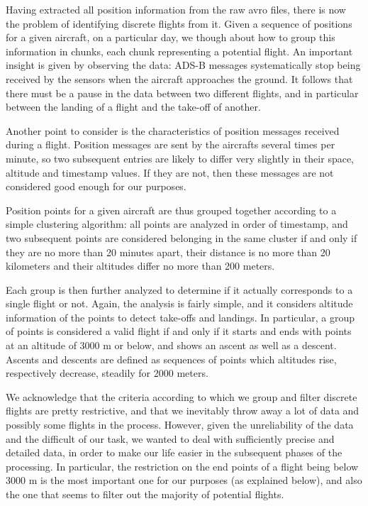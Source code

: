 \documentclass{vldb}
\begin{document}
Having extracted all position information from the raw avro files, there is now
the problem of identifying discrete flights from it.
Given a sequence of positions for a given aircraft, on a particular day, we
though about how to group this information in chunks, each chunk representing a
potential flight. An important insight is given by observing the data: ADS-B
messages systematically stop being received by the sensors when the aircraft
approaches the ground. It follows that there must be a pause in the data between
two different flights, and in particular between the landing of a flight and the
take-off of another.

Another point to consider is the characteristics of position messages received
during a flight. Position messages are sent by the aircrafts several times per
minute, so two subsequent entries are likely to differ very slightly in their
space, altitude and timestamp values. If they are not, then these messages are
not considered good enough for our purposes.

Position points for a given aircraft are thus grouped together according to a
simple clustering algorithm: all points are analyzed in order of timestamp, and
two subsequent points are considered belonging in the same cluster if and only
if they are no more than 20 minutes apart, their distance is no more than 20
kilometers and their altitudes differ no more than 200 meters.

Each group is then further analyzed to determine if it actually corresponds to a
single flight or not. Again, the analysis is fairly simple, and it considers
altitude information of the points to detect take-offs and landings. In
particular, a group of points is considered a valid flight if and only if it
starts and ends with points at an altitude of 3000 m or below, and shows an
ascent as well as a descent. Ascents and descents are defined as sequences of
points which altitudes rise, respectively decrease, steadily for 2000 meters.

We acknowledge that the criteria according to which we group and filter discrete
flights are pretty restrictive, and that we inevitably throw away a lot of data
and possibly some flights in the process. However, given the unreliability of
the data and the difficult of our task, we wanted to deal with sufficiently
precise and detailed data, in order to make our life easier in the subsequent
phases of the processing. In particular, the restriction on the end points of a
flight being below 3000 m is the most important one for our purposes (as
explained below), and also the one that seems to filter out the majority of
potential flights.
\end{document}
